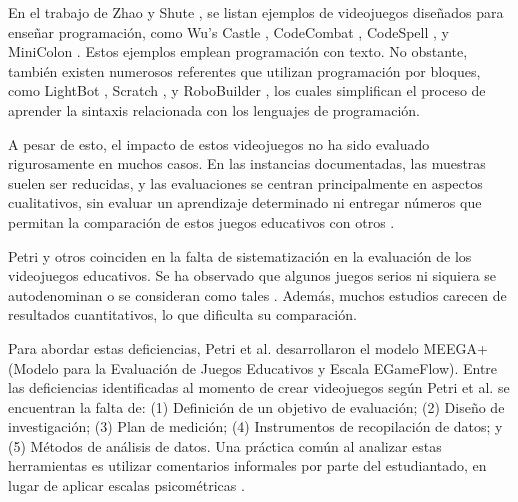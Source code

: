 En el trabajo de Zhao y Shute \cite{video_game_foster_computational_thinking}, se listan ejemplos de videojuegos diseñados para enseñar programación, como Wu's Castle \cite{wuscastle}, CodeCombat \cite{CodeCombat}, CodeSpell \cite{codespells}, y MiniColon \cite{minicolon}. Estos ejemplos emplean programación con texto. No obstante, también existen numerosos referentes que utilizan programación por bloques, como LightBot \cite{LightBot}, Scratch \cite{ scratch, maloney2010scratch}, y RoboBuilder \cite{RoboBuilder}, los cuales simplifican el proceso de aprender la sintaxis relacionada con los lenguajes de programación.

A pesar de esto, el impacto de estos videojuegos no ha sido evaluado rigurosamente en muchos casos. En las instancias documentadas, las muestras suelen ser reducidas, y las evaluaciones se centran principalmente en aspectos cualitativos, sin evaluar un aprendizaje determinado ni entregar números que permitan la comparación de estos juegos educativos con otros \cite{video_game_foster_computational_thinking, effectiveness_gbl}.

Petri y otros \cite{meegaplus} coinciden en la falta de sistematización en la evaluación de los videojuegos educativos. Se ha observado que algunos juegos serios ni siquiera se autodenominan o se consideran como tales \cite{evaluation_of_games_for_teaching_cs}. Además, muchos estudios carecen de resultados cuantitativos, lo que dificulta su comparación. 

Para abordar estas deficiencias, Petri et al. \cite{meegaplus} desarrollaron el modelo MEEGA+ (Modelo para la Evaluación de Juegos Educativos y Escala EGameFlow). Entre las deficiencias identificadas al momento de crear videojuegos según Petri et al. \cite{meegaplus} se encuentran la falta de: 
(1) Definición de un objetivo de evaluación; (2) Diseño de investigación; (3) Plan de medición; (4) Instrumentos de recopilación de datos; y (5) Métodos de análisis de datos. Una práctica común al analizar estas herramientas es utilizar comentarios informales por parte del estudiantado, en lugar de aplicar escalas psicométricas \cite{meegaplus}.



